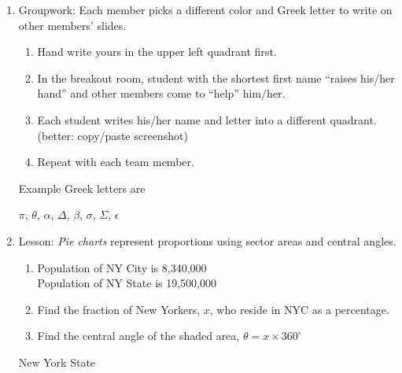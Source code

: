 \documentclass[12pt, twoside]{article}
\begin{document}
\begin{enumerate}
\newpage
\item Groupwork: Each member picks a different color and Greek letter to write on other members' slides. 
\begin{enumerate}
  \item Hand write yours in the upper left quadrant first.
  \item In the breakout room, student with the shortest first name ``raises his/her hand'' and other members come to ``help'' him/her.
  \item Each student writes his/her name and letter into a different quadrant. (better: copy/paste screenshot)
  \item Repeat with each team member.
\end{enumerate}
\begin{center}
\end{center}
Example Greek letters are 
{\Large$\pi$, $\theta$, $\alpha$, $\Delta$, $\beta$, $\sigma$, $\Sigma$, $\epsilon$ \par}

\newpage
\item Lesson: \emph{Pie charts} represent proportions using sector areas and central angles.
  \begin{multicols}{2}
  \raggedcolumns
  \begin{enumerate}%
    \item Population of NY City is 8,340,000\\
    Population of NY State is 19,500,000
    \item Find the fraction of New Yorkers, $x$, who reside in NYC as a percentage. \vspace{2cm}
    \item Find the central angle of the shaded area, $\theta = x \times 360^\circ$
  \end{enumerate}
  \columnbreak
  \begin{flushright}
    New York State
  \end{flushright}
  \end{multicols}


\end{enumerate}
\end{document}
